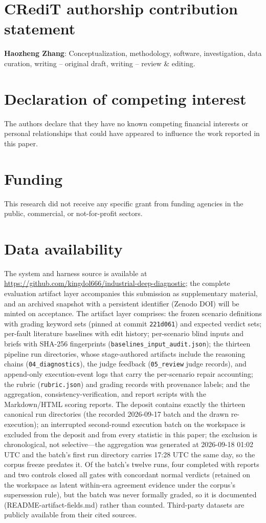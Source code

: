 \documentclass[preprint,12pt]{elsarticle}
\begin{document}
\section*{CRediT authorship contribution statement}
\textbf{Haozheng Zhang}: Conceptualization, methodology, software, investigation, data curation, writing -- original draft, writing -- review \& editing.

\section*{Declaration of competing interest}
The authors declare that they have no known competing financial interests or personal relationships that could have appeared to influence the work reported in this paper.

\section*{Funding}
This research did not receive any specific grant from funding agencies in the public, commercial, or not-for-profit sectors.

\section*{Data availability}
The system and harness source is available at \url{https://github.com/kingdol666/industrial-deep-diagnostic}; the complete evaluation artifact layer accompanies this submission as supplementary material, and an archived snapshot with a persistent identifier (Zenodo DOI) will be minted on acceptance. The artifact layer comprises: the frozen scenario definitions with grading keyword sets (pinned at commit \texttt{221d061}) and expected verdict sets; per-fault literature baselines with edit history; per-scenario blind inputs and briefs with SHA-256 fingerprints (\texttt{baselines\_input\_audit.json}); the thirteen pipeline run directories, whose stage-authored artifacts include the reasoning chains (\texttt{04\_diagnostics}), the judge feedback (\texttt{05\_review} judge records), and append-only execution-event logs that carry the per-scenario repair accounting; the rubric (\texttt{rubric.json}) and grading records with provenance labels; and the aggregation, consistency-verification, and report scripts with the Markdown/HTML scoring reports. The deposit contains exactly the thirteen canonical run directories (the recorded 2026-09-17 batch and the drawn re-execution); an interrupted second-round execution batch on the workspace is excluded from the deposit and from every statistic in this paper; the exclusion is chronological, not selective---the aggregation was generated at 2026-09-18 01:02 UTC and the batch's first run directory carries 17:28 UTC the same day, so the corpus freeze predates it. Of the batch's twelve runs, four completed with reports and two controls closed all gates with concordant normal verdicts (retained on the workspace as latent within-era agreement evidence under the corpus's supersession rule), but the batch was never formally graded, so it is documented (README-artifact-fields.md) rather than counted. Third-party datasets are publicly available from their cited sources.
\end{document}
